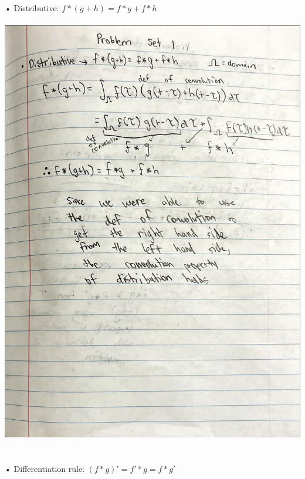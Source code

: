 \documentclass[12pt]{article}
\begin{document}
• Distributive: $f*(g+h) = f*g + f*h$\\\\
\includegraphics[scale=0.23]{Distributive.jpeg}\\\\\\
• Differentiation rule: $(f*g)' = f'*g = f * g'$\\\\
\end{document}
